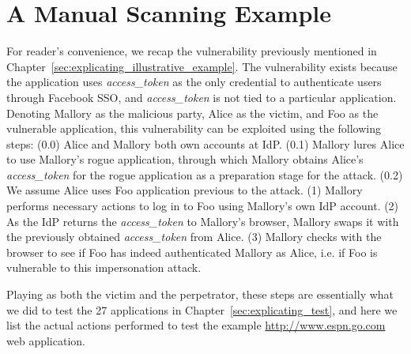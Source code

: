 \section{A Manual Scanning Example}
\label{sec:ssoscan_manual_example}

For reader's convenience, we recap the vulnerability previously mentioned in Chapter~\ref{sec:explicating_illustrative_example}.  The vulnerability exists because the application uses \emph{access\_token} as the only credential to authenticate users through Facebook SSO, and \emph{access\_token} is not tied to a particular application.  Denoting Mallory as the malicious party, Alice as the victim, and Foo as the vulnerable application, this vulnerability can be exploited using the following steps:  (0.0) Alice and Mallory both own accounts at IdP.  (0.1) Mallory lures Alice to use Mallory's rogue application, through which Mallory obtains Alice's \emph{access\_token} for the rogue application as a preparation stage for the attack.  (0.2) We assume Alice uses Foo application previous to the attack.  (1) Mallory performs necessary actions to log in to Foo using Mallory's own IdP account.  (2) As the IdP returns the \emph{access\_token} to Mallory's browser, Mallory swaps it with the previously obtained \emph{access\_token} from Alice.  (3) 
Mallory checks with the browser to see if Foo has indeed authenticated Mallory as Alice, i.e. if Foo is vulnerable to this impersonation attack.

Playing as both the victim and the perpetrator, these steps are essentially what we did to test the 27 applications in Chapter~\ref{sec:explicating_test}, and here we list the actual actions performed to test the example \url{http://www.espn.go.com} web application.  

